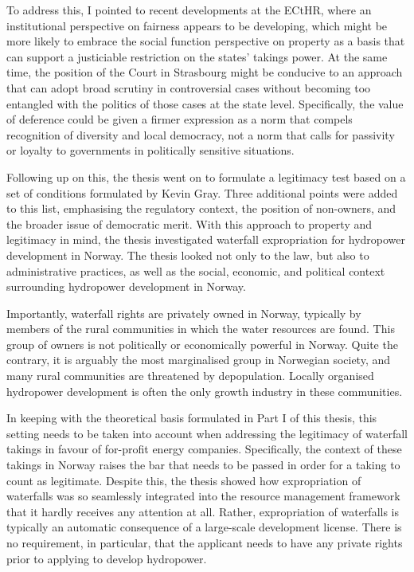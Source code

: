 To address this, I pointed to recent developments at the ECtHR, where an institutional perspective on fairness appears to be developing, which might be more likely to embrace the social function perspective on property as a basis that can support a justiciable restriction on the states' takings power. At the same time, the position of the Court in Strasbourg might be conducive to an approach that can adopt broad scrutiny in controversial cases without becoming too entangled with the politics of those cases at the state level. Specifically, the value of deference could be given a firmer expression as a norm that compels recognition of diversity and local democracy, not a norm that calls for passivity or loyalty to governments in politically sensitive situations.

Following up on this, the thesis went on to formulate a legitimacy test based on a set of conditions formulated by Kevin Gray. Three additional points were added to this list, emphasising the regulatory context, the position of non-owners, and the broader issue of democratic merit. With this approach to property and legitimacy in mind, the thesis investigated waterfall expropriation for hydropower development in Norway. The thesis looked not only to the law, but also to administrative practices, as well as the social, economic, and political context surrounding hydropower development in Norway.

Importantly, waterfall rights are privately owned in Norway, typically by members of the rural communities in which the water resources are found. This group of owners is not politically or economically powerful in Norway. Quite the contrary, it is arguably the most marginalised group in Norwegian society, and many rural communities are threatened by depopulation. Locally organised hydropower development is often the only growth industry in these communities.

In keeping with the theoretical basis formulated in Part I of this thesis, this setting needs to be taken into account when addressing the legitimacy of waterfall takings in favour of for-profit energy companies. Specifically, the context of these takings in Norway raises the bar that needs to be passed in order for a taking to count as legitimate. Despite this, the thesis showed how expropriation of waterfalls was so seamlessly integrated into the resource management framework that it hardly receives any attention at all. Rather, expropriation of waterfalls is typically an automatic consequence of a large-scale development license. There is no requirement, in particular, that the applicant needs to have any private rights prior to applying to develop hydropower.

